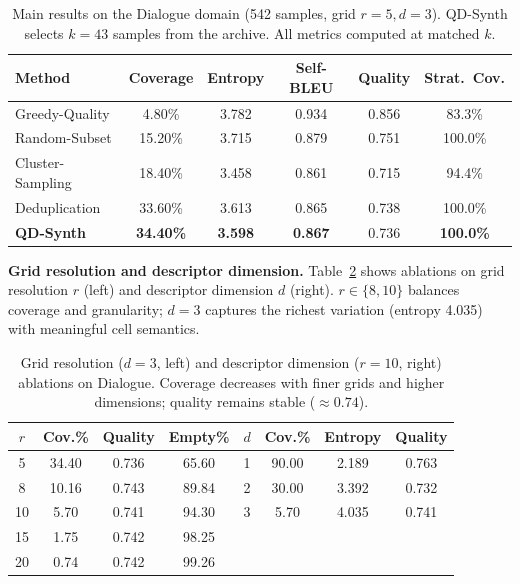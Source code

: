 \documentclass{article}
\theoremstyle{plain}
\theoremstyle{remark}
\begin{document}
\begin{table}[h]
\centering
\caption{Main results on the Dialogue domain (542 samples, grid $r=5, d=3$). QD-Synth selects $k=43$ samples from the archive. All metrics computed at matched $k$.}
\label{tab:main_dialogue}
\begin{tabular}{lccccc}
\toprule
\textbf{Method} & \textbf{Coverage} & \textbf{Entropy} & \textbf{Self-BLEU} & \textbf{Quality} & \textbf{Strat.\ Cov.} \\
\midrule
Greedy-Quality & 4.80\% & 3.782 & 0.934 & 0.856 & 83.3\% \\
Random-Subset & 15.20\% & 3.715 & 0.879 & 0.751 & 100.0\% \\
Cluster-Sampling & 18.40\% & 3.458 & 0.861 & 0.715 & 94.4\% \\
Deduplication & 33.60\% & 3.613 & 0.865 & 0.738 & 100.0\% \\
\textbf{QD-Synth} & \textbf{34.40\%} & \textbf{3.598} & \textbf{0.867} & 0.736 & \textbf{100.0\%} \\
\bottomrule
\end{tabular}
\end{table}

\textbf{Grid resolution and descriptor dimension.}
Table~\ref{tab:app_ablation_grid_dim} shows ablations on grid resolution $r$ (left) and descriptor dimension $d$ (right).
$r \in \{8, 10\}$ balances coverage and granularity; $d{=}3$ captures the richest variation (entropy 4.035) with meaningful cell semantics.

\begin{table}[h]
\centering
\caption{Grid resolution ($d{=}3$, left) and descriptor dimension ($r{=}10$, right) ablations on Dialogue. Coverage decreases with finer grids and higher dimensions; quality remains stable (${\approx}0.74$).}
\label{tab:app_ablation_grid_dim}
\begin{tabular}{cccc|cccc}
\toprule
$r$ & Cov.\% & Quality & Empty\% & $d$ & Cov.\% & Entropy & Quality \\
\midrule
5  & 34.40 & 0.736 & 65.60 & 1 & 90.00 & 2.189 & 0.763 \\
8  & 10.16 & 0.743 & 89.84 & 2 & 30.00 & 3.392 & 0.732 \\
10 & 5.70  & 0.741 & 94.30 & 3 & 5.70  & 4.035 & 0.741 \\
15 & 1.75  & 0.742 & 98.25 &   &       &       &       \\
20 & 0.74  & 0.742 & 99.26 &   &       &       &       \\
\bottomrule
\end{tabular}
\end{table}
\end{document}
